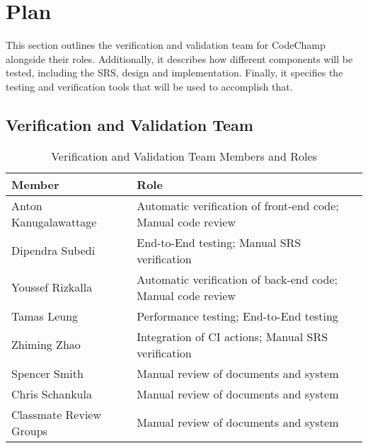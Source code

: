 \documentclass[12pt, titlepage]{article}
\begin{document}
\section{Plan}


This section outlines the verification and validation team for CodeChamp alongside their roles. Additionally, it describes how different components will be tested, including the SRS, design and implementation. Finally, it specifies the testing and verification tools that will be used to accomplish that.

\subsection{Verification and Validation Team}



\begin{table}[h]
\begin{center}
\begin{tabular}{|l | l|}
\hline
  \textbf{Member} & \textbf{Role}\\
  \hline
  Anton Kanugalawattage & Automatic verification of front-end code; Manual code review\\
  \hline
  Dipendra Subedi & End-to-End testing; Manual SRS verification\\
  \hline
  Youssef Rizkalla & Automatic verification of back-end code; Manual code review\\
  \hline
  Tamas Leung & Performance testing; End-to-End testing\\
  \hline
  Zhiming Zhao & Integration of CI actions; Manual SRS verification\\
  \hline
  Spencer Smith & Manual review of documents and system\\
  \hline
  Chris Schankula & Manual review of documents and system\\
  \hline
  Classmate Review Groups & Manual review of documents and system\\
  \hline
\end{tabular}
\end{center}
\caption{Verification and Validation Team Members and Roles}            

\end{table}
\end{document}
